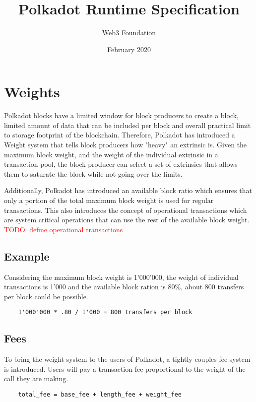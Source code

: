 \documentclass[11pt,a4paper]{article}
\newcommand{\todo}[1]{\textcolor{red}{TODO: #1}}
\begin{document}
\title{Polkadot Runtime Specification}
\author{Web3 Foundation}
\date{February 2020}
\maketitle

\section{Weights}
Polkadot blocks have a limited window for block producers to create a block,
limited amount of data that can be included per block and overall practical limit
to storage footprint of the blockchain. Therefore, Polkadot has introduced a Weight
system that tells block producers how "heavy" an extrinsic is. Given the maximum
block weight, and the weight of the individual extrinsic in a transaction pool,
the block producer can select a set of extrinsics that allows them to saturate the
block while not going over the limits.
\newline

Additionally, Polkadot has introduced an available block ratio which ensures that
only a portion of the total maximum block weight is used for regular transactions.
This also introduces the concept of operational transactions which are system
critical operations that can use the rest of the available block weight.
\todo{define operational transactions}

\subsection*{Example}
Considering the maximum block weight is 1'000'000, the weight of
individual transactions is 1'000 and the available block ration is 80\%,
about 800 transfers per block could be possible.

\begin{verbatim}
    1'000'000 * .80 / 1'000 = 800 transfers per block
\end{verbatim}

\subsection{Fees}
To bring the weight system to the users of Polkadot, a tightly couples fee system
is introduced. Users will pay a transaction fee proportional to the weight of the
call they are making.

\begin{verbatim}
    total_fee = base_fee + length_fee + weight_fee
\end{verbatim}
\end{document}

